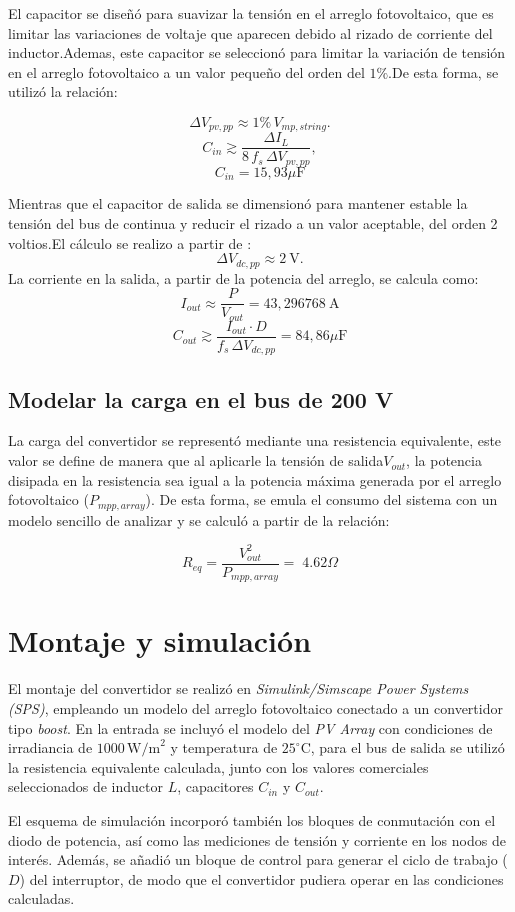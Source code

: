 El capacitor se diseñó para suavizar la tensión en el arreglo fotovoltaico, que es limitar las variaciones de voltaje que aparecen debido al rizado de corriente del inductor.Ademas, este capacitor se seleccionó para limitar la  variación de tensión en el arreglo fotovoltaico a un valor pequeño del orden del $1\%$.De esta forma, se utilizó la relación:

\[
\Delta V_{pv,pp} \approx 1\%  \, V_{mp,string}.
\]
\[
C_{in} \gtrsim \frac{\Delta I_L}{8 \, f_s \, \Delta V_{pv,pp}},
\]
\[
C_{in} ={15,93\mu\text{F}}
\]

Mientras que el capacitor de salida se dimensionó para mantener estable la tensión del bus de continua y reducir el rizado a un valor aceptable, del orden 2 voltios.El cálculo se realizo a partir de :
\[
\Delta V_{dc,pp} \approx 2\ \mathrm{V}.
\]
La corriente en la salida, a partir de la potencia del arreglo, se calcula como:
\[
I_{out} \approx \frac{P}{V_{out}} = 43,296768\ \mathrm{A}
\]
\[
C_{out} \gtrsim \frac{I_{out} \cdot D}{f_s \, \Delta V_{dc,pp}}=84,86\mu\text{F}
\]

\subsection*{ Modelar la carga en el bus de 200 V}
La carga del convertidor se representó mediante una resistencia equivalente, este valor se define de manera que al aplicarle la tensión de salida$V_{out}$, la potencia disipada en la resistencia sea igual a la potencia máxima generada por el arreglo fotovoltaico ($P_{mpp,array}$). De esta forma, se emula el consumo del sistema con un modelo sencillo de analizar y se calculó a partir de la relación:

\[
R_{eq} = \frac{V_{out}^2}{P_{mpp,array}} = \; 4.62 \Omega
\]
\section{Montaje y simulación}
El montaje del convertidor se realizó en \textit{Simulink/Simscape Power Systems (SPS)}, empleando un modelo del arreglo fotovoltaico conectado a un convertidor tipo \textit{boost}. En la entrada se incluyó el modelo del \textit{PV Array} con condiciones de irradiancia de $1000 \,\text{W/m}^2$ y temperatura de $25^\circ \text{C}$, para el bus de salida se utilizó la resistencia equivalente calculada, junto con los valores comerciales seleccionados de inductor $L$, capacitores $C_{in}$ y $C_{out}$.  

El esquema de simulación incorporó también los bloques de conmutación con el diodo de potencia, así como las mediciones de tensión y corriente en los nodos de interés. Además, se añadió un bloque de control para generar el ciclo de trabajo ($D$) del interruptor, de modo que el convertidor pudiera operar en las condiciones calculadas.  


